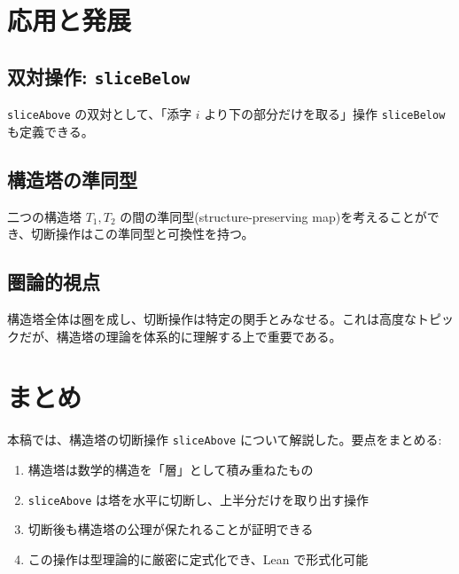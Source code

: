 \documentclass[a4paper,11pt]{article}
\theoremstyle{definition}
\begin{document}
\section{応用と発展}

\subsection{双対操作: \texttt{sliceBelow}}

\texttt{sliceAbove} の双対として、「添字 $i$ より下の部分だけを取る」操作 \texttt{sliceBelow} も定義できる。

\begin{center}
\end{center}

\subsection{構造塔の準同型}

二つの構造塔 $T_1, T_2$ の間の準同型(structure-preserving map)を考えることができ、切断操作はこの準同型と可換性を持つ。

\subsection{圏論的視点}

構造塔全体は圏を成し、切断操作は特定の関手とみなせる。これは高度なトピックだが、構造塔の理論を体系的に理解する上で重要である。

\section{まとめ}

本稿では、構造塔の切断操作 \texttt{sliceAbove} について解説した。要点をまとめる:

\begin{enumerate}
    \item 構造塔は数学的構造を「層」として積み重ねたもの
    \item \texttt{sliceAbove} は塔を水平に切断し、上半分だけを取り出す操作
    \item 切断後も構造塔の公理が保たれることが証明できる
    \item この操作は型理論的に厳密に定式化でき、Lean で形式化可能
\end{enumerate}
\end{document}

